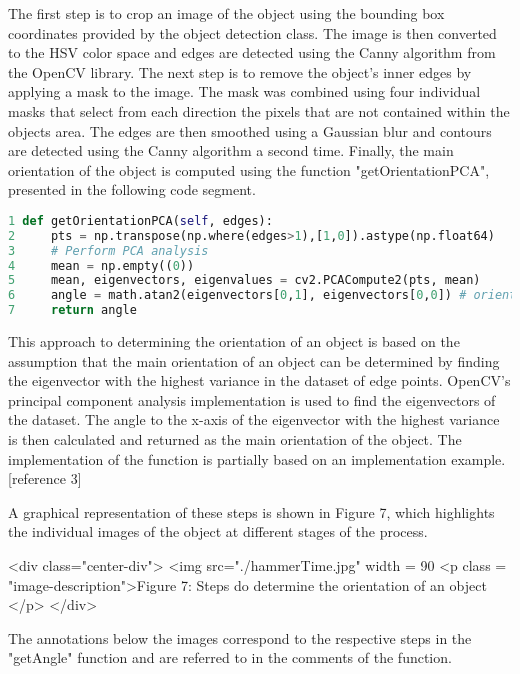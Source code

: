 The first step is to crop an image of the object using the bounding box coordinates provided by the object detection class. The image is then converted to the HSV color space and edges are detected using the Canny algorithm from the OpenCV library. The next step is to remove the object's inner edges by applying a mask to the image. The mask was combined using four individual masks that select from each direction the pixels that are not contained within the objects area. The edges are then smoothed using a Gaussian blur and contours are detected using the Canny algorithm a second time. Finally, the main orientation of the object is computed using the function "getOrientationPCA", presented in the following code segment.

\begin{lstlisting}[language=python]
1 def getOrientationPCA(self, edges):
2     pts = np.transpose(np.where(edges>1),[1,0]).astype(np.float64)
3     # Perform PCA analysis
4     mean = np.empty((0))
5     mean, eigenvectors, eigenvalues = cv2.PCACompute2(pts, mean)
6     angle = math.atan2(eigenvectors[0,1], eigenvectors[0,0]) # orientation in radians
7     return angle
\end{lstlisting}
This approach to determining the orientation of an object is based on the assumption that the main orientation of an object can be determined by finding the eigenvector with the highest variance in the dataset of edge points. OpenCV's principal component analysis implementation is used to find the eigenvectors of the dataset. The angle to the x-axis of the eigenvector with the highest variance is then calculated and returned as the main orientation of the object. The implementation of the function is partially based on an implementation example. [reference 3]

A graphical representation of these steps is shown in Figure 7, which highlights the individual images of the object at different stages of the process. 

<div class="center-div">
  <img src="./hammerTime.jpg" width = 90%
  <p class = "image-description">Figure 7: Steps do determine the orientation of an object </p>
</div>

The annotations below the images correspond to the respective steps in the "getAngle" function and are referred to in the comments of the function.

